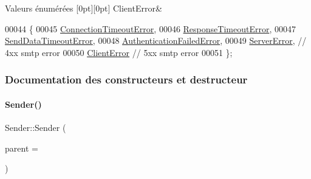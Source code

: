 \begin{DoxyEnumFields}{Valeurs énumérées}
[0pt][0pt]{}\mbox{\label{class_simple_mail_1_1_sender_a276560e9e955ab6be451338c3776bf49af0e582ca123f321e33c607f9548b913a}} 
Client\+Error&\\
\hline

\end{DoxyEnumFields}

\begin{DoxyCode}
00044     \{
00045         \hyperlink{class_simple_mail_1_1_sender_a276560e9e955ab6be451338c3776bf49a103e98eb7c1b1d901137406cba3af5a3}{ConnectionTimeoutError},
00046         \hyperlink{class_simple_mail_1_1_sender_a276560e9e955ab6be451338c3776bf49ab7330dcb7ea2b4435124d62245cbe052}{ResponseTimeoutError},
00047         \hyperlink{class_simple_mail_1_1_sender_a276560e9e955ab6be451338c3776bf49a6ba07629b5f05025424b0bf377705caf}{SendDataTimeoutError},
00048         \hyperlink{class_simple_mail_1_1_sender_a276560e9e955ab6be451338c3776bf49a2d402af356c1513cf08749bf7a204703}{AuthenticationFailedError},
00049         \hyperlink{class_simple_mail_1_1_sender_a276560e9e955ab6be451338c3776bf49aa5d58da2b004bb7275a92029fe432089}{ServerError},    \textcolor{comment}{// 4xx smtp error}
00050         \hyperlink{class_simple_mail_1_1_sender_a276560e9e955ab6be451338c3776bf49af0e582ca123f321e33c607f9548b913a}{ClientError}     \textcolor{comment}{// 5xx smtp error}
00051     \};
\end{DoxyCode}


\subsubsection{Documentation des constructeurs et destructeur}
\mbox{\label{class_simple_mail_1_1_sender_afbe94a9a42b0101deb08204393ec9669}} 
\paragraph{\texorpdfstring{Sender()}{Sender()}\hspace{0.1cm}{\footnotesize\ttfamily [1/2]}}
{\footnotesize\ttfamily Sender\+::\+Sender (\begin{DoxyParamCaption}\item[{\hyperlink{class_q_object}{Q\+Object} $\ast$}]{parent = {} }\end{DoxyParamCaption})\hspace{0.3cm}{\ttfamily [explicit]}}


